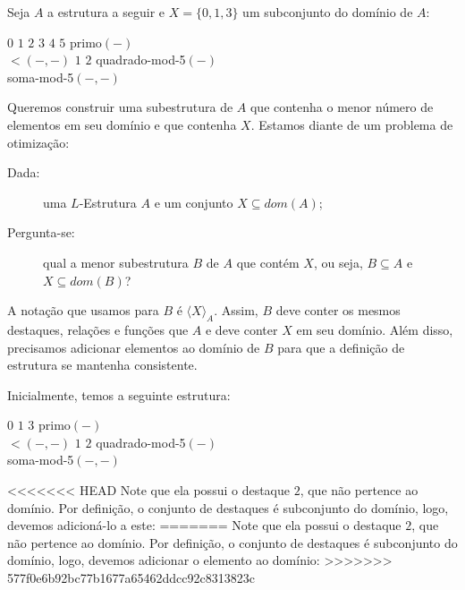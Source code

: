 Seja $A$ a estrutura a seguir e $X = \{0,1,3\}$ um subconjunto do domínio de $A$:
\begin{center}
    \begin{structure}
        {}
        {$0$ $1$ $2$ $3$ $4$ $5$}
        {primo$(-)$\\$<$$(-,-)$}
        {$1$ $2$}
        {quadrado-mod-5$(-)$\\soma-mod-5$(-,-)$}
    \end{structure} 
\end{center}

Queremos construir uma subestrutura de $A$ que contenha o menor número de elementos em seu domínio e que contenha $X$. Estamos diante de um problema de otimização:

\begin{description}
    \item[Dada:] uma $L$-Estrutura $A$ e um conjunto $X \subseteq dom(A)$;
    \item[Pergunta-se:] qual a menor subestrutura $B$ de $A$ que contém $X$, ou seja, $B \subseteq A$ e $X \subseteq dom(B)$?   
\end{description}
A notação que usamos para $B$ é $\langle X \rangle_A$. Assim, $B$ deve conter os mesmos destaques, relações e funções que $A$ e deve conter $X$ em seu domínio. Além disso, precisamos adicionar elementos ao domínio de $B$ para que a definição de estrutura se mantenha consistente. 

Inicialmente, temos a seguinte estrutura:
\begin{center}
    \begin{structure}
        {}
        {$0$ $1$ $3$}
        {primo$(-)$\\$<$$(-,-)$}
        {$1$ $2$}
        {quadrado-mod-5$(-)$\\soma-mod-5$(-,-)$}
    \end{structure} 
\end{center}

<<<<<<< HEAD
Note que ela possui o destaque $2$, que não pertence ao domínio. Por definição, o conjunto de destaques é subconjunto do domínio, logo, devemos adicioná-lo a este:
=======
Note que ela possui o destaque $2$, que não pertence ao domínio. Por definição, o conjunto de destaques é subconjunto do domínio, logo, devemos adicionar o elemento ao domínio:
>>>>>>> 577f0e6b92bc77b1677a65462ddcc92c8313823c
\begin{center}
\end{center}

